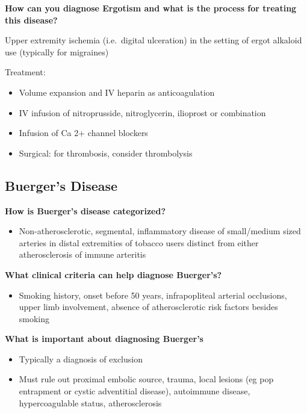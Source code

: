 \documentclass[
]{book}
\providecommand{\tightlist}{%
  \setlength{\itemsep}{0pt}\setlength{\parskip}{0pt}}
\begin{document}
\textbf{How can you diagnose Ergotism and what is the process for treating
this disease?}

Upper extremity ischemia (i.e.~digital ulceration) in the setting of
ergot alkaloid use (typically for migraines)~

Treatment:~

\begin{itemize}
\item
  Volume expansion and IV heparin as anticoagulation~
\item
  IV infusion of nitroprusside, nitroglycerin, ilioprost or
  combination
\item
  Infusion of Ca 2+ channel blockers~
\item
  Surgical: for thrombosis, consider thrombolysis~
\end{itemize}

\hypertarget{buergers-disease}{%
\subsection{\texorpdfstring{\textbf{Buerger's Disease}}{Buerger's Disease}}\label{buergers-disease}}

\textbf{How is Buerger's disease categorized?}
\citep{jacklcronenwettVascularDecisionMaking2020}

\begin{itemize}
\tightlist
\item
  Non-atherosclerotic, segmental, inflammatory disease of small/medium
  sized arteries in distal extremities of tobacco users distinct from
  either atherosclerosis of immune arteritis
\end{itemize}

\textbf{What clinical criteria can help diagnose Buerger's?}

\begin{itemize}
\tightlist
\item
  Smoking history, onset before 50 years, infrapopliteal arterial
  occlusions, upper limb involvement, absence of atherosclerotic risk
  factors besides smoking
\end{itemize}

\textbf{What is important about diagnosing Buerger's}

\begin{itemize}
\item
  Typically a diagnosis of exclusion
\item
  Must rule out proximal embolic source, trauma, local lesions (eg pop
  entrapment or cystic adventitial disease), autoimmune disease,
  hypercoagulable status, atherosclerosis
\end{itemize}
\end{document}
